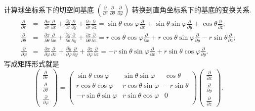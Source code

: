         \begin{example}
            计算球坐标系下的切空间基底
            $\left(\frac{\partial}{\partial r}\ \frac{\partial}{\partial \theta}\ \frac{\partial}{\partial \varphi}\right)$
            转换到直角坐标系下的基底的变换关系.
            \begin{eqnarray*}
                \frac{\partial}{\partial r}&=&\frac{\partial x}{\partial r}\frac{\partial }{\partial x}+\frac{\partial y}{\partial r}\frac{\partial }{\partial y}+\frac{\partial z}{\partial r}\frac{\partial }{\partial z}=\sin\theta \cos\varphi\frac{\partial }{\partial x}+\sin\theta \sin\varphi\frac{\partial }{\partial y}+\cos\theta\frac{\partial }{\partial z};\\
                \frac{\partial}{\partial \theta}&=&\frac{\partial x}{\partial \theta}\frac{\partial }{\partial x}+\frac{\partial y}{\partial \theta}\frac{\partial }{\partial y}+\frac{\partial z}{\partial \theta}\frac{\partial }{\partial z}=r\cos\theta \cos\varphi\frac{\partial }{\partial x}+r\cos\theta \sin\varphi\frac{\partial }{\partial y}-r\sin\theta\frac{\partial }{\partial z};\\
                \frac{\partial}{\partial \varphi}&=&\frac{\partial x}{\partial \varphi}\frac{\partial }{\partial x}+\frac{\partial y}{\partial \varphi}\frac{\partial }{\partial y}+\frac{\partial z}{\partial \varphi}\frac{\partial }{\partial z}=-r\sin\theta \sin\varphi\frac{\partial }{\partial x}+r\sin\theta \cos\varphi\frac{\partial }{\partial y}.
            \end{eqnarray*}
            写成矩阵形式就是
            \begin{equation}
                \begin{pmatrix}
                    \frac{\partial}{\partial r}\\
                    \frac{\partial}{\partial \theta}\\
                    \frac{\partial}{\partial \varphi}	
                \end{pmatrix}
                =
                \begin{pmatrix}
                    \sin\theta \cos\varphi&\sin\theta \sin\varphi&\cos\theta\\
                    r\cos\theta \cos\varphi&r\cos\theta \sin\varphi&-r\sin\theta\\
                    -r\sin\theta \sin\varphi&r\sin\theta \cos\varphi&0\\	
                \end{pmatrix}
                \begin{pmatrix}
                    \frac{\partial}{\partial x}\\
                    \frac{\partial}{\partial y}\\
                    \frac{\partial}{\partial z}	
                \end{pmatrix}.
            \end{equation}
        \end{example}
